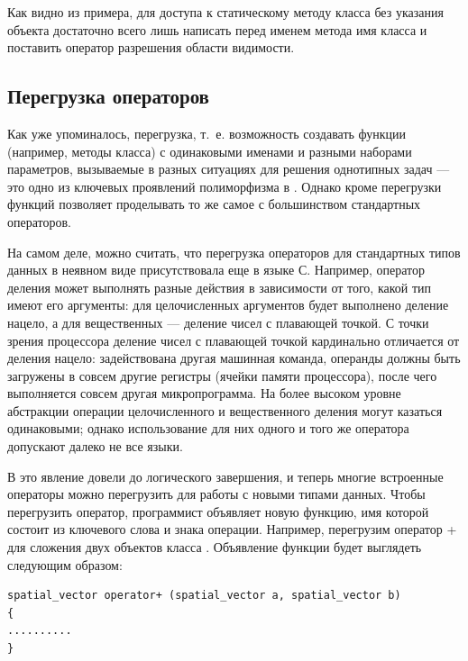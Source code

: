 Как видно из примера, для доступа к статическому методу класса без указания объекта достаточно всего лишь написать перед
именем метода имя класса и поставить оператор разрешения области видимости.

\subsection[Перегрузка операторов ]{Перегрузка операторов}\label{ch10:1.7}
Как уже упоминалось, перегрузка, т.~е. возможность создавать функции (например,
методы класса) с одинаковыми именами и разными наборами параметров, вызываемые в разных ситуациях для решения
однотипных задач --- это одно из ключевых проявлений полиморфизма в . Однако кроме перегрузки функций  позволяет
проделывать то же самое с большинством стандартных операторов.

На самом деле, можно считать, что перегрузка операторов для стандартных типов данных в
неявном виде присутствовала еще в языке С. Например, оператор деления может выполнять разные действия в зависимости от
того, какой тип имеют его аргументы: для целочисленных аргументов будет выполнено деление нацело, а для вещественных ---
деление чисел с плавающей точкой. С точки зрения процессора деление чисел с плавающей точкой кардинально отличается от
деления нацело: задействована другая машинная команда, операнды должны быть загружены в совсем другие регистры (ячейки
памяти  процессора), после чего выполняется совсем другая микропрограмма. На более высоком уровне абстракции операции
целочисленного и вещественного деления могут казаться одинаковыми; однако использование для них одного и того же
оператора допускают далеко не все языки.

В  это явление довели до логического завершения, и теперь многие встроенные операторы можно
перегрузить для работы с новыми типами данных. Чтобы перегрузить оператор, программист объявляет новую функцию, имя
которой состоит из ключевого слова  и знака операции. Например,
перегрузим оператор + для сложения двух объектов класса
. Объявление функции будет выглядеть
следующим образом:
\begin{lstlisting}
spatial_vector operator+ (spatial_vector a, spatial_vector b) 
{
..........
}
\end{lstlisting}

